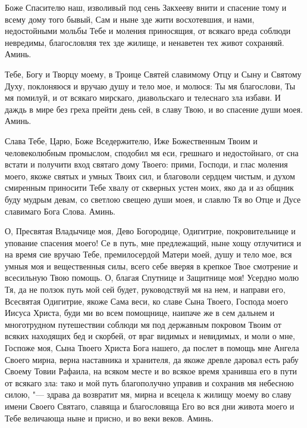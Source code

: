 \nopagebreak\bigskip\bigskip\mychapterending

 


Боже Спасителю наш, изволивый под сень Закхееву внити и спасение тому и всему дому того бывый, Сам и ныне зде жити восхотевшия, и нами, недостойными мольбы Тебе и моления приносящия, от всякаго вреда соблюди невредимы, благословляя тех зде жилище, и ненаветен тех живот сохраняяй. Аминь. 



\nopagebreak\bigskip\bigskip\mychapterending

 


Тебе, Богу и Творцу моему, в Троице Святей славимому Отцу и Сыну и Святому Духу, поклоняюся и вручаю душу и тело мое, и молюся: Ты мя благослови, Ты мя помилуй, и от всякаго мирскаго, диавольскаго и телеснаго зла избави. И даждь в мире без греха прейти день сей, в славу Твою, и во спасение души моея. Аминь.


Слава Тебе, Царю, Боже Вседержителю, Иже Божественным Твоим и человеколюбным промыслом, сподобил мя еси, грешнаго и недостойнаго, от сна встати и получити вход святаго дому Твоего: прими, Господи, и глас моления моего, якоже святых и умных Твоих сил, и благоволи сердцем чистым, и духом смиренным приносити Тебе хвалу от скверных устен моих, яко да и аз общник буду мудрым девам, со светлою свещею души моея, и славлю Тя во Отце и Дусе славимаго Бога Слова. Аминь.



\nopagebreak\bigskip\bigskip\mychapterending

 


О, Пресвятая Владычице моя, Дево Богородице, Одигитрие, покровительнице и упование спасения моего! Се в путь, мне предлежащий, ныне хощу отлучитися и на время сие вручаю Тебе, премилосердой Матери моей, душу и тело мое, вся умныя моя и вещественныя силы, всего себе вверяя в крепкое Твое смотрение и всесильную Твою помощь. О, благая Спутнице и Защитнице моя! Усердно молю Тя, да не ползок путь мой сей будет, руководствуй мя на нем, и направи его, Всесвятая Одигитрие, якоже Сама веси, ко славе Сына Твоего, Господа моего Иисуса Христа, буди ми во всем помощнице, наипаче же в сем дальнем и многотрудном путешествии соблюди мя под державным покровом Твоим от всяких находящих бед и скорбей, от враг видимых и невидимых, и моли о мне, Госпоже моя, Сына Твоего Христа Бога нашего, да послет в помощь мне Ангела Своего мирна, верна наставника и хранителя, да якоже древле даровал есть рабу Своему Товии Рафаила, на всяком месте и во всякое время хранивша его в пути от всякаго зла: тако и мой путь благополучно управив и сохранив мя небесною силою, "--- здрава да возвратит мя, мирна и всецела к жилищу моему во славу имени Своего Святаго, славяща и благословяща Его во вся дни живота моего и Тебе величающа ныне и присно, и во веки веков. Аминь.

